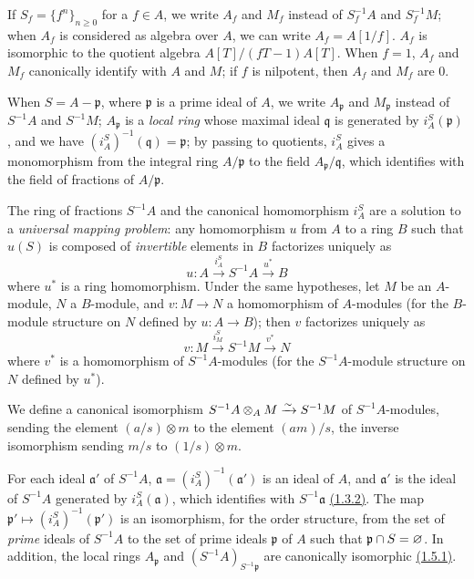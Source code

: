 \begin{env}[1.2.3]
\label{env-0.1.2.3}
If $S_f=\{f^n\}_{n\geqslant 0}$ for a $f\in A$, we write $A_f$ and $M_f$ instead
of $S_f^{-1}A$ and $S_f^{-1}M$; when $A_f$ is considered as algebra over $A$, we
can write $A_f=A[1/f]$. $A_f$ is isomorphic to the quotient algebra
$A[T]/(fT-1)A[T]$. When $f=1$, $A_f$ and $M_f$ canonically identify with $A$ and
$M$; if $f$ is nilpotent, then $A_f$ and $M_f$ are $0$.

When $S=A-\mathfrak{p}$, where $\mathfrak{p}$ is a prime ideal of $A$, we write
$A_\mathfrak{p}$ and $M_\mathfrak{p}$ instead of $S^{-1}A$ and $S^{-1}M$;
$A_\mathfrak{p}$ is a {\em local ring} whose maximal ideal $\mathfrak{q}$ is
generated by $i_A^S(\mathfrak{p})$, and we have
$(i_A^S)^{-1}(\mathfrak{q})=\mathfrak{p}$; by passing to quotients, $i_A^S$
gives a monomorphism from the integral ring $A/\mathfrak{p}$ to the field
$A_\mathfrak{p}/\mathfrak{q}$, which identifies with the field of fractions of
$A/\mathfrak{p}$.
\end{env}

\begin{env}[1.2.4]
\label{env-0.1.2.4}
The ring of fractions $S^{-1}A$ and the canonical homomorphism $i_A^S$ are a
solution to a {\em universal mapping problem}: any homomorphism $u$ from $A$ to
a ring $B$ such that $u(S)$ is composed of {\em invertible} elements in $B$
factorizes uniquely as
\[
  u:A\xrightarrow{i_A^S}S^{-1}A\xrightarrow{u^*}B
\]
where $u^*$ is a ring homomorphism. Under the same hypotheses, let $M$ be an
$A$-module, $N$ a $B$-module, and $v:M\to N$ a homomorphism of $A$-modules (for
the $B$-module structure on $N$ defined by $u:A\to B$); then $v$ factorizes
uniquely as
\[
  v:M\xrightarrow{i_M^S}S^{-1}M\xrightarrow{v^*}N
\]
where $v^*$ is a homomorphism of $S^{-1}A$-modules (for the $S^{-1}A$-module
structure on $N$ defined by $u^*$).
\end{env}

\begin{env}[1.2.5]
\label{env-0.1.2.5}
We define a canonical isomorphism $S^{-1}A\otimes_A M\xrightarrow{\sim} S^{-1}M$ of
$S^{-1}A$-modules, sending the element $(a/s)\otimes m$ to the element $(am)/s$,
the inverse isomorphism sending $m/s$ to $(1/s)\otimes m$.
\end{env}

\begin{env}[1.2.6]
\label{env-0.1.2.6}
For each ideal $\mathfrak{a}'$ of $S^{-1}A$,
$\mathfrak{a}=(i_A^S)^{-1}(\mathfrak{a}')$ is an ideal of $A$, and
$\mathfrak{a}'$ is the ideal of $S^{-1}A$ generated by $i_A^S(\mathfrak{a})$,
which identifies with $S^{-1}\mathfrak{a}$ \hyperref[env-0.1.3.2]{(1.3.2)}. The map
$\mathfrak{p}'\mapsto(i_A^S)^{-1}(\mathfrak{p}')$ is an isomorphism, for the
order structure, from the set of {\em prime} ideals of $S^{-1}A$ to the set of
prime ideals $\mathfrak{p}$ of $A$ such that $\mathfrak{p}\cap S=\varnothing$. In
addition, the local rings $A_\mathfrak{p}$ and $(S^{-1}A)_{S^{-1}\mathfrak{p}}$
are canonically isomorphic \hyperref[env-0.1.5.1]{(1.5.1)}.
\end{env}

